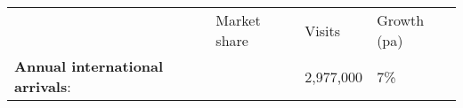 \begin{tabular}[t]{p{2.95cm}>{\hfill}p{1.35cm}>{\hfill}p{1.1cm}>{\hfill}p{1.7cm}}
   & Market share & Visits & Growth (pa) \\ 
 \textbf{Annual international arrivals}: &   & 2,977,000 & 7\% \\ 
  \end{tabular}
